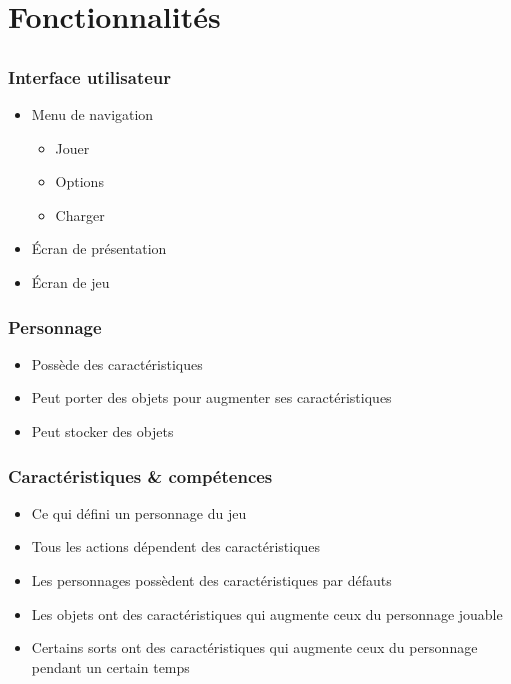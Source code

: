 \documentclass{beamer}
\begin{document}
\section{Fonctionnalités}
\subsection{}
\begin{frame}
\frametitle{Interface utilisateur}
\begin{itemize}
	\item Menu de navigation
	\begin{itemize}
		\item Jouer
		\item Options
		\item Charger
	\end{itemize}
	\item Écran de présentation
	\item Écran de jeu
\end{itemize}
\end{frame}

\begin{frame}
\frametitle{Personnage}
\begin{itemize}
	\item Possède des caractéristiques
	\item Peut porter des objets pour augmenter ses caractéristiques
	\item Peut stocker des objets
\end{itemize}
\end{frame}

\begin{frame}
\frametitle{Caractéristiques \& compétences}
\begin{itemize}
	\item Ce qui défini un personnage du jeu
	\item Tous les actions dépendent des caractéristiques
	\item Les personnages possèdent des caractéristiques par défauts
	\item Les objets ont des caractéristiques qui augmente ceux du personnage jouable
	\item Certains sorts ont des caractéristiques qui augmente ceux du personnage pendant un certain temps
\end{itemize}
\end{frame}
\end{document}
